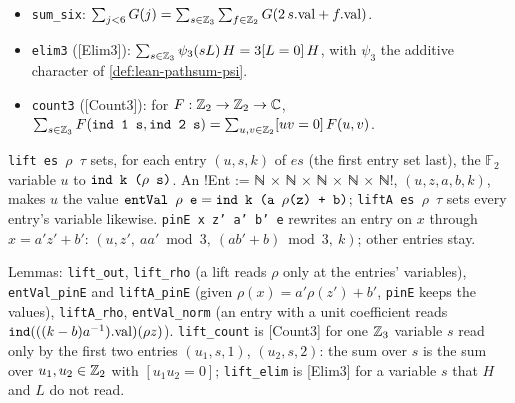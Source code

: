 \begin{theorem}\label{thm:lean-pathsum-elim3}
\begin{itemize}
\item \textnormal{\texttt{sum\_six}}: $\sum_{j<6}G(j) = \sum_{s\in\mathbb{Z}_{3}}\sum_{f\in\mathbb{Z}_{2}}G(2\,s.\mathrm{val}+f.\mathrm{val})$.
\item \textnormal{\texttt{elim3}} ([Elim3]): $\sum_{s\in\mathbb{Z}_{3}}\psi_3(sL)\,H = 3[L=0]\,H$, with $\psi_3$ the additive
  character of \cref{def:lean-pathsum-psi}.
\item \textnormal{\texttt{count3}} ([Count3]): for $F:\mathbb{Z}_{2}\to\mathbb{Z}_{2}\to\mathbb{C}$,
  $\sum_{s\in\mathbb{Z}_{3}}F(\textnormal{\texttt{ind 1 s}},\textnormal{\texttt{ind 2 s}}) = \sum_{u,v\in\mathbb{Z}_{2}}[uv=0]\,F(u,v)$.
\end{itemize}
\end{theorem}

\begin{definition}\label{def:lean-pathsum-lifta}
\textnormal{\texttt{lift es \ensuremath{\rho} \ensuremath{\tau}}} sets, for each entry $(u,s,k)$ of $es$ (the first entry set last), the
$\mathbb F_2$ variable $u$ to $\textnormal{\texttt{ind k (\ensuremath{\rho} s)}}$. An 
\lean!Ent := ℕ × ℕ × ℕ × ℕ × ℕ!, $(u,z,a,b,k)$, makes $u$ the value
$\textnormal{\texttt{entVal \ensuremath{\rho} e}} = \textnormal{\texttt{ind k (a \ensuremath{\rho}(z) + b)}}$; \textnormal{\texttt{liftA es \ensuremath{\rho} \ensuremath{\tau}}} sets every entry's
variable likewise. \textnormal{\texttt{pinE x z' a' b' e}} rewrites an entry on $x$ through
$x=a'z'+b'$: $(u,z',\ a a'\bmod3,\ (a b'+b)\bmod3,\ k)$; other entries stay.
\end{definition}
\noindent Lemmas: \textnormal{\texttt{lift\_out}}, \textnormal{\texttt{lift\_rho}} (a lift reads $\rho$ only at the entries'
variables), \textnormal{\texttt{entVal\_pinE}} and \textnormal{\texttt{liftA\_pinE}} (given $\rho(x)=a'\rho(z')+b'$, \textnormal{\texttt{pinE}}
keeps the values), \textnormal{\texttt{liftA\_rho}}, \textnormal{\texttt{entVal\_norm}} (an entry with a unit coefficient reads
$\textnormal{\texttt{ind}}(((k-b)a^{-1}).\mathrm{val})(\rho z)$). \textnormal{\texttt{lift\_count}} is [Count3] for one $\mathbb{Z}_{3}$ variable
$s$ read only by the first two entries $(u_1,s,1)$, $(u_2,s,2)$: the sum over $s$ is the sum over
$u_1,u_2\in\mathbb{Z}_{2}$ with $[u_1u_2=0]$; \textnormal{\texttt{lift\_elim}} is [Elim3] for a variable $s$ that $H$ and $L$
do not read.


